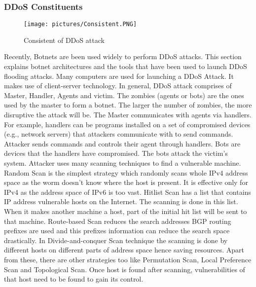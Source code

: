 \documentclass{ijitcs}
\begin{document}
\subsubsection{DDoS Constituents}
\begin{figure}[h]
    \centering
\texttt{[image: pictures/Consistent.PNG]}
    \caption{Consistent of DDoS attack}
    \label{fig:consistnt}
\end{figure}
Recently, Botnets are been used widely to perform DDoS attacks. This section explains botnet architectures and
the tools that have been used to launch DDoS flooding attacks. Many computers are used for launching a DDoS
Attack. It makes use of client-server technology. In general, DDoS attack comprises of Master, Handler, Agents and
victim. The zombies (agents or bots) are the ones used by the master to form a botnet. The larger the number of zombies, the more disruptive the attack will be. The Master communicates with agents via handlers. For example, handlers can be programs installed on a set of compromised devices (e.g., network servers) that attackers communicate with to send commands. Attacker sends commands and controls their agent through handlers. Bots are
devices that the handlers have compromised.
The bots attack the victim’s system. Attacker uses many scanning techniques to find a vulnerable machine.
Random Scan is the simplest strategy which randomly scans whole IPv4 address space as the worm doesn’t know
where the host is present. It is effective only for IPv4 as the address space of IPv6 is too vast. Hitlist Scan has a
list that contains IP address vulnerable hosts on the Internet. The scanning is done in this list. When it makes
another machine a host, part of the initial hit list will be sent to that machine. Route-based Scan reduces the search
addresses BGP routing prefixes are used and this prefixes information can reduce the search space drastically. In
Divide-and-conquer Scan technique the scanning is done by different hosts on different parts of address space hence
saving resources. Apart from these, there are other strategies too like Permutation Scan, Local Preference Scan
and Topological Scan. Once host is found after scanning, vulnerabilities of that host need to be found to gain its
control\cite{deshmukh2015understanding}. 
\end{document}

